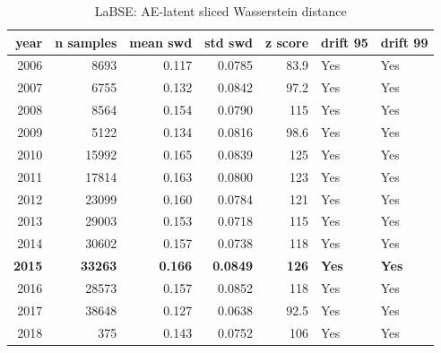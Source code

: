 \begin{table}[ht]
\centering
\caption{LaBSE: AE-latent sliced Wasserstein distance}
\label{tab:labse_latent_swd}
\begin{tabular}{rrrrrll}
\toprule
year & n samples & mean swd & std swd & z score & drift 95 & drift 99 \\
\midrule
2006 & 8693 & 0.117 & 0.0785 & 83.9 & Yes & Yes \\
2007 & 6755 & 0.132 & 0.0842 & 97.2 & Yes & Yes \\
2008 & 8564 & 0.154 & 0.0790 & 115 & Yes & Yes \\
2009 & 5122 & 0.134 & 0.0816 & 98.6 & Yes & Yes \\
2010 & 15992 & 0.165 & 0.0839 & 125 & Yes & Yes \\
2011 & 17814 & 0.163 & 0.0800 & 123 & Yes & Yes \\
2012 & 23099 & 0.160 & 0.0784 & 121 & Yes & Yes \\
2013 & 29003 & 0.153 & 0.0718 & 115 & Yes & Yes \\
2014 & 30602 & 0.157 & 0.0738 & 118 & Yes & Yes \\
\textbf{2015} & \textbf{33263} & \textbf{0.166} & \textbf{0.0849} & \textbf{126} & \textbf{Yes} & \textbf{Yes} \\
2016 & 28573 & 0.157 & 0.0852 & 118 & Yes & Yes \\
2017 & 38648 & 0.127 & 0.0638 & 92.5 & Yes & Yes \\
2018 & 375 & 0.143 & 0.0752 & 106 & Yes & Yes \\
\bottomrule
\end{tabular}
\end{table}
